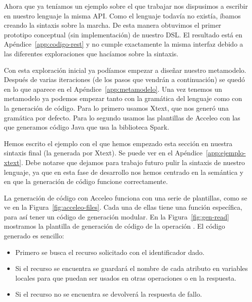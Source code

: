 \documentclass[runningheads]{llncs}
\begin{document}
Ahora que ya teníamos un ejemplo sobre el que trabajar nos dispusimos
a escribir en nuestro lenguaje la misma API. Como el lenguaje todavía
no existía, íbamos creando la sintaxis sobre la marcha. De esta manera
obtuvimos el primer prototipo conceptual (sin implementación) de nuestro
DSL. El resultado está en Apéndice~\ref{app:codigo-rest} y no cumple
exactamente la misma interfaz debido a las diferentes exploraciones que
hacíamos sobre la sintaxis.


Con esta exploración inicial ya podíamos empezar a diseñar
nuestro metamodelo.  Después de varias iteraciones (de los pasos
que vendrán a continuación) se quedó en lo que aparece en el
Apéndice~\ref{app:metamodelo}. Una vez tenemos un metamodelo ya podemos
empezar tanto con la gramática del lenguaje como con la generación de
código. Para lo primero usamos Xtext, que nos generó una gramática
por defecto. Para lo segundo usamos las plantillas de Acceleo con las
que generamos código Java que usa la biblioteca Spark.

Hemos escrito el ejemplo con el que hemos empezado esta sección en
nuestra sintaxis final (la generada por Xtext). Se puede ver en el
Apéndice~\ref{app:ejemplo-xtext}. Debe notarse que dejamos para trabajo
futuro pulir la sintaxis de nuestro lenguaje, ya que en esta fase de
desarrollo nos hemos centrado en la semántica y en que la generación
de código funcione correctamente.

La generación de código con Acceleo funciona con una serie de
plantillas, como se ve en la Figura~\ref{fig:acceleo-files}. Cada una
de ellas tiene una función específica, para así tener un código
de generación modular. En la Figura~\ref{fig:gen-read} mostramos la
plantilla de generación de código de la operación \READ. El código generado
es sencillo:

\begin{itemize}
    \item Primero se busca el recurso solicitado con el identificador dado.
    \item Si el recurso se encuentra se guardará el nombre de cada atributo
        en variables locales para que puedan ser usados en otras
        operaciones o en la respuesta.
    \item Si el recurso no se encuentra se devolverá la respuesta de fallo.
\end{itemize}
\end{document}
